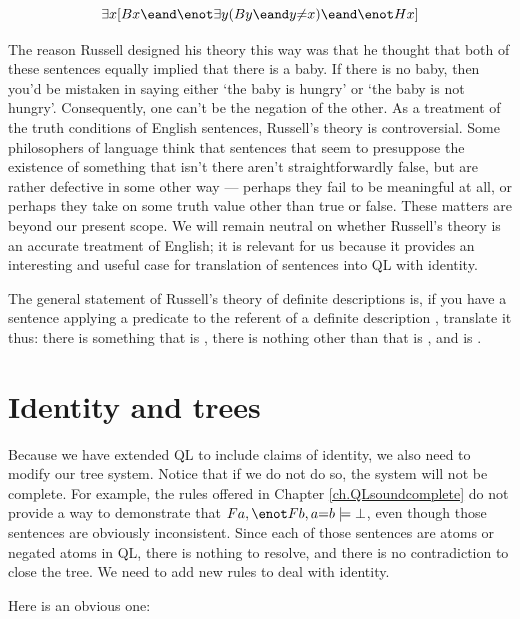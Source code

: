 \begin{equation*}
\exists x [Bx \eand \enot \exists y (By \eand y {\neq} x) \eand \enot Hx]
\end{equation*}

The reason Russell designed his theory this way was that he thought that both of these sentences equally implied that there is a baby. If there is no baby, then you'd be mistaken in saying either `the baby is hungry' or `the baby is not hungry'. Consequently, one can't be the negation of the other. As a treatment of the truth conditions of English sentences, Russell's theory is controversial. Some philosophers of language think that sentences that seem to presuppose the existence of something that isn't there aren't straightforwardly false, but are rather defective in some other way --- perhaps they fail to be meaningful at all, or perhaps they take on some truth value other than true or false. These matters are beyond our present scope. We will remain neutral on whether Russell's theory is an accurate treatment of English; it is relevant for us because it provides an interesting and useful case for translation of sentences into QL with identity.

The general statement of Russell's theory of definite descriptions is, if you have a sentence applying a predicate  to the referent of a definite description , translate it thus: there is something  that is , there is nothing other than  that is , and  is .


\section{Identity and trees}
\label{sec.identity.trees}

Because we have extended QL to include claims of identity, we also need to modify our tree system. Notice that if we do not do so, the system will not be complete. For example, the rules offered in Chapter \ref{ch.QLsoundcomplete} do not provide a way to demonstrate that $Fa, \enot Fb, a{=}b \models \bot$, even though those sentences are obviously inconsistent. Since each of those sentences are atoms or negated atoms in QL, there is nothing to resolve, and there is no contradiction to close the tree. We need to add new rules to deal with identity.

Here is an obvious one:


